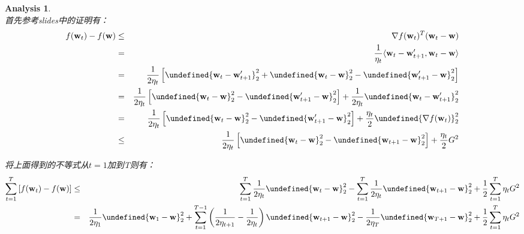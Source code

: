 \documentclass[a4paper,UTF8]{article}
\let\norm\undefined %
\DeclarePairedDelimiter\norm{\lVert}{\rVert}
\numberwithin{equation}{section}
\newtheorem*{myAnalysis}{Analysis}
\begin{document}
\begin{myAnalysis}~\\
首先参考slides中的证明有：
\begin{eqnarray*}
f(\mathbf{w}_t) - f(\mathbf{w}) &\le& \nabla f(\mathbf{w}_t) ^ T (\mathbf{w}_t - \mathbf{w}) \\
&=& \frac{1}{\eta_t} \langle \mathbf{w}_t - \mathbf{w}_{t+1}', \mathbf{w}_t - \mathbf{w} \rangle \\
&=& \frac{1}{2\eta_t} \left[ \norm{\mathbf{w}_t - \mathbf{w}_{t+1}'}_2^2 + \norm{\mathbf{w}_t - \mathbf{w}}_2^2 - \norm{\mathbf{w}_{t+1}' - \mathbf{w}}_2^2 \right] \\
&=& \frac{1}{2\eta_t} \left[ \norm{\mathbf{w}_t - \mathbf{w}}_2^2 - \norm{\mathbf{w}_{t+1}' - \mathbf{w}}_2^2 \right] + \frac{1}{2\eta_t} \norm{\mathbf{w}_t - \mathbf{w}_{t+1}'}_2^2 \\
&=& \frac{1}{2\eta_t} \left[ \norm{\mathbf{w}_t - \mathbf{w}}_2^2 - \norm{\mathbf{w}_{t+1}' - \mathbf{w}}_2^2 \right] + \frac{\eta_t}{2} \norm{\nabla f(\mathbf{w}_t)}_2^2 \\
&\le& \frac{1}{2\eta_t} \left[ \norm{\mathbf{w}_t - \mathbf{w}}_2^2 - \norm{\mathbf{w}_{t+1} - \mathbf{w}}_2^2 \right] + \frac{\eta_t}{2} G^2
\end{eqnarray*}

将上面得到的不等式从$t=1$加到T则有：
\begin{eqnarray*}
\sum_{t=1}^T \left[ f(\mathbf{w}_t) - f(\mathbf{w}) \right] &\le& \sum_{t=1}^T \frac{1}{2\eta_t} \norm{\mathbf{w}_t - \mathbf{w}}_2^2 - \sum_{t=1}^T \frac{1}{2\eta_t} \norm{\mathbf{w}_{t+1} - \mathbf{w}}_2^2 + \frac{1}{2} \sum_{t=1}^T \eta_t G^2 \\
&=& \frac{1}{2\eta_1} \norm{\mathbf{w}_1 - \mathbf{w}}_2^2 + \sum_{t=1}^{T - 1} \left( \frac{1}{2\eta_{t+1}} - \frac{1}{2\eta_t} \right) \norm{\mathbf{w}_{t+1} - \mathbf{w}}_2^2 - \frac{1}{2\eta_T}\norm{\mathbf{w}_{T+1} - \mathbf{w}}_2^2 + \frac{1}{2} \sum_{t=1}^T \eta_t G^2
\end{eqnarray*}


\end{myAnalysis}
\end{document}
